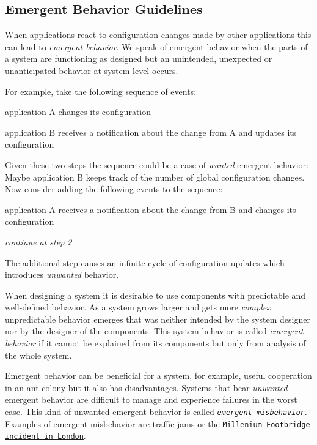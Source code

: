 \subsection*{Emergent Behavior Guidelines}

When applications react to configuration changes made by other applications this can lead to {\itshape emergent behavior}. We speak of emergent behavior when the parts of a system are functioning as designed but an unintended, unexpected or unanticipated behavior at system level occurs.

For example, take the following sequence of events\+:


\begin{DoxyEnumerate}
\item application {\ttfamily A} changes its configuration
\item application {\ttfamily B} receives a notification about the change from {\ttfamily A} and updates its configuration
\end{DoxyEnumerate}

Given these two steps the sequence could be a case of {\itshape wanted} emergent behavior\+: Maybe application {\ttfamily B} keeps track of the number of global configuration changes. Now consider adding the following events to the sequence\+:


\begin{DoxyEnumerate}
\item application {\ttfamily A} receives a notification about the change from {\ttfamily B} and changes its configuration
\item {\itshape continue at step 2}
\end{DoxyEnumerate}

The additional step causes an infinite cycle of configuration updates which introduces {\itshape unwanted} behavior.

When designing a system it is desirable to use components with predictable and well-\/defined behavior. As a system grows larger and gets more {\itshape complex} unpredictable behavior emerges that was neither intended by the system designer nor by the designer of the components. This system behavior is called {\itshape emergent behavior} if it cannot be explained from its components but only from analysis of the whole system.

Emergent behavior can be beneficial for a system, for example, useful cooperation in an ant colony but it also has disadvantages. Systems that bear {\itshape unwanted} emergent behavior are difficult to manage and experience failures in the worst case. This kind of unwanted emergent behavior is called \href{http://www.hpl.hp.com/techreports/2006/HPL-2006-2.html}{\tt {\itshape emergent misbehavior}}. Examples of emergent misbehavior are traffic jams or the \href{https://researchcourse.pbworks.com/f/structural+engineering.pdf}{\tt Millenium Footbridge} \href{https://www.sciencedaily.com/releases/2005/11/051103080801.htm}{\tt incident in London}.

